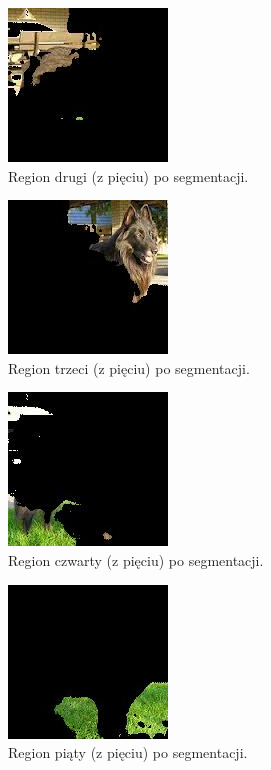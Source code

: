 \documentclass[10pt]{llncs}
\begin{document}
\FloatBarrier

\begin{figure}[h!]
  \centering
  \includegraphics[scale=.8, clip]{img/images_k5_1.jpg}
	\caption[]
  {Region drugi (z pięciu) po segmentacji.}
\end{figure}

\FloatBarrier

\begin{figure}[h!]
  \centering
  \includegraphics[scale=.8, clip]{img/images_k5_2.jpg}
	\caption[]
  {Region trzeci (z pięciu) po segmentacji.}
\end{figure}

\FloatBarrier

\begin{figure}[h!]
  \centering
  \includegraphics[scale=.8, clip]{img/images_k5_3.jpg}
	\caption[]
  {Region czwarty (z pięciu) po segmentacji.}
\end{figure}

\FloatBarrier

\begin{figure}[h!]
  \centering
  \includegraphics[scale=.8, clip]{img/images_k5_4.jpg}
	\caption[]
  {Region piąty (z pięciu) po segmentacji.}
\end{figure}
\end{document}
